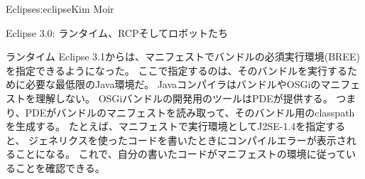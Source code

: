 \begin{aosachapter}{Eclipse}{s:eclipse}{Kim Moir}
\begin{aosasect1}{Eclipse 3.0: ランタイム、RCPそしてロボットたち}
\begin{aosasect2}{ランタイム}
Eclipse 3.1からは、マニフェストでバンドルの必須実行環境(BREE)を指定できるようになった。
ここで指定するのは、そのバンドルを実行するために必要な最低限のJava環境だ。
JavaコンパイラはバンドルやOSGiのマニフェストを理解しない。
OSGiバンドルの開発用のツールはPDEが提供する。
つまり、PDEがバンドルのマニフェストを読み取って、そのバンドル用のclasspathを生成する。
たとえば、マニフェストで実行環境としてJ2SE-1.4を指定すると、
ジェネリクスを使ったコードを書いたときにコンパイルエラーが表示されることになる。
これで、自分の書いたコードがマニフェストの環境に従っていることを確認できる。


\end{aosasect2}
\end{aosasect1}
\end{aosachapter}
